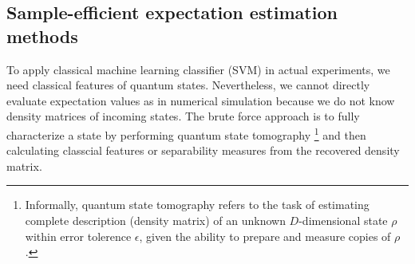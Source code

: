 \documentclass[
reprint,
aps,
pra,
floatfix,
]{revtex4-2}
\theoremstyle{plain}
\theoremstyle{definition}
\newtheorem{problem}{Problem}
\newcommand{\dm}{\rho}
\begin{document}
\subsection{Sample-efficient expectation estimation methods}\label{sec:estimation}
To apply classical machine learning classifier (SVM) in actual experiments, we need classical features of quantum states.
Nevertheless, we cannot directly evaluate expectation values as in numerical simulation because we do not know density matrices of incoming states.
The brute force approach is to fully characterize a state by performing quantum state tomography 
\footnote{Informally, quantum state tomography refers to the task of estimating complete description (density matrix) of an unknown $D$-dimensional state $\dm$ within error tolerence $\epsilon$, 
given the ability to prepare and measure copies of $\dm$.}
and then calculating classcial features or separability measures from the recovered density matrix.
\end{document}
